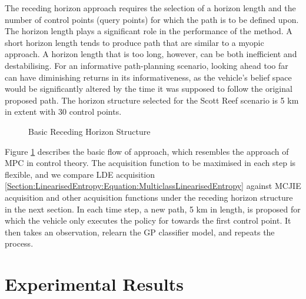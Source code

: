 \documentclass{article}
\begin{document}
		The receding horizon approach requires the selection of a horizon length and the number of control points (query points) for which the path is to be defined upon. The horizon length plays a significant role in the performance of the method. A short horizon length tends to produce path that are similar to a myopic approach. A horizon length that is too long, however, can be both inefficient and destabilising. For an informative path-planning scenario, looking ahead too far can have diminishing returns in its informativeness, as the vehicle's belief space would be significantly altered by the time it was supposed to follow the original proposed path. The horizon structure selected for the Scott Reef scenario is 5 km in extent with 30 control points.

	
		\begin{figure}[!htbp]
			\begin{center}
			\end{center}
		\caption{Basic Receding Horizon Structure}
		\label{Figure:Results:RecedingHorizonMethodOutline}
		\end{figure}
				
		Figure \ref{Figure:Results:RecedingHorizonMethodOutline} describes the basic flow of approach, which resembles the approach of MPC in control theory. The acquisition function to be maximised in each step is flexible, and we compare LDE acquisition \eqref{Section:LinearisedEntropy:Equation:MulticlassLinearisedEntropy} against MCJIE acquisition and other acquisition functions under the receding horizon structure in the next section. In each time step, a new path, 5 km in length, is proposed for which the vehicle only executes the policy for towards the first control point. It then takes an observation, relearn the GP classifier model, and repeats the process. 
		
\section{Experimental Results}
\label{Section:ExperimentalResults}
\end{document}
